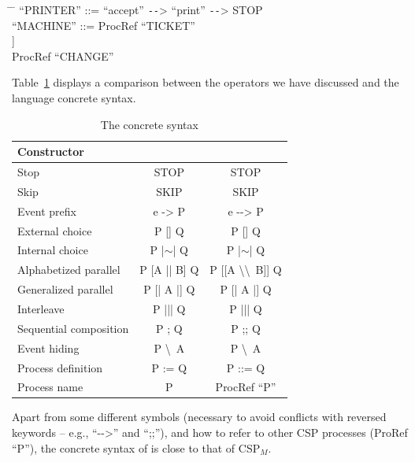 \begin{tabbing}
	\hspace*{1em}\= \hspace*{6.4em} \= \kill
	``PRINTER'' ::= ``accept'' \texttt{-{}-}> ``print'' \texttt{-{}-}> STOP\\

	``MACHINE'' ::= ProcRef ``TICKET''\\
	\>\> [[ \{\{``cash'', ``ticket''\}\} \textbackslash\textbackslash \ \{\{``cash'', ``change''\}\} ]]\\
	\>\> ProcRef ``CHANGE''
\end{tabbing}

Table~\ref{tab:cspm-csp_coq} displays a comparison between the \CSPM{} operators we have discussed and the \CSPcoq{} language concrete syntax.

\begin{table}[htb]
	\begin{center}
		\caption[The \CSPcoq{} concrete syntax]{The \CSPcoq{} concrete syntax}
		\label{tab:cspm-csp_coq}
		\begin{tabular}{ |l|c|c| }
			\hline
			Constructor & \CSPM{} & \CSPcoq{} \\
			\hline
			Stop & STOP & STOP \\ [0.5ex]
			Skip & SKIP & SKIP \\ [0.5ex]
			Event prefix & e -> P & e -{}-> P \\  [0.5ex]
			External choice & P [] Q & P [] Q \\  [0.5ex]
			Internal choice & P |$ \sim $| Q & P |$ \sim $| Q \\ [0.5ex]
			Alphabetized parallel & P [A || B] Q & P [[A \textbackslash\textbackslash \ B]] Q \\ [0.5ex]
			Generalized parallel & P [| A |] Q & P [| A |] Q \\ [0.5ex]
			Interleave & P ||| Q & P ||| Q \\ [0.5ex]
			Sequential composition & P ; Q & P ;; Q \\ [0.5ex]
			Event hiding & P \textbackslash \ A & P \textbackslash \ A \\ [0.5ex]
			Process definition & P := Q & P ::= Q \\ [0.5ex]
			Process name & P & ProcRef ``P'' \\ [0.5ex]
			\hline
		\end{tabular}
	\end{center}
\end{table}

Apart from some different symbols (necessary to avoid conflicts with reversed keywords -- e.g., ``-{}->'' and ``;;''), and how to refer to other CSP processes (ProRef ``P''), the concrete syntax of \CSPcoq{} is close to that of CSP$_{M}$.

